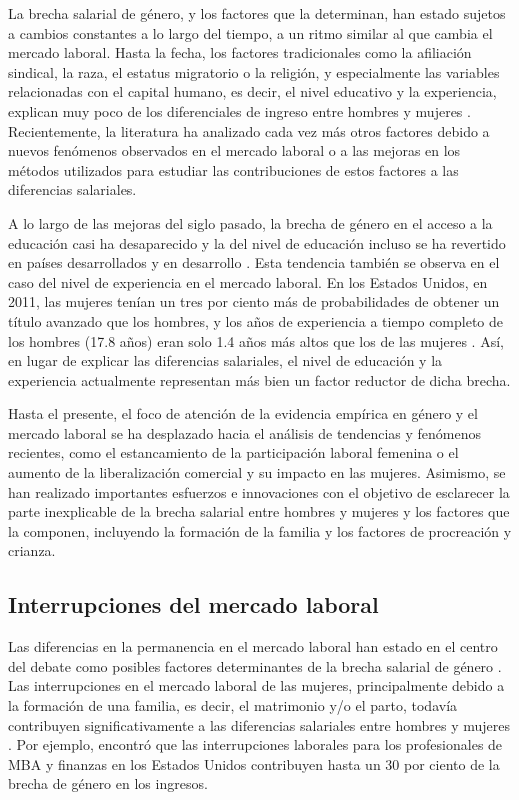 La brecha salarial de género, y los factores que la determinan, han estado sujetos a cambios constantes a lo largo del tiempo, a un ritmo similar al que cambia el mercado laboral. Hasta la fecha, los factores tradicionales como la afiliación sindical, la raza, el estatus migratorio o la religión, y especialmente las variables relacionadas con el capital humano, es decir, el nivel educativo y la experiencia, explican muy poco de los diferenciales de ingreso entre hombres y mujeres \citep{Blau2017,Weichselbaumer2005}. Recientemente, la literatura ha analizado cada vez más otros factores debido a nuevos fenómenos observados en el mercado laboral o a las mejoras en los métodos utilizados para estudiar las contribuciones de estos factores a las diferencias salariales.

A lo largo de las mejoras del siglo pasado, la brecha de género en el acceso a la educación casi ha desaparecido y la del nivel de educación incluso se ha revertido en países desarrollados y en desarrollo \citep{Becker2010,Gaddis2013,Goldin2006}.  Esta tendencia también se observa en el caso del nivel de experiencia en el mercado laboral. En los Estados Unidos, en 2011, las mujeres tenían un tres por ciento más de probabilidades de obtener un título avanzado que los hombres, y los años de experiencia a tiempo completo de los hombres (17.8 años) eran solo 1.4 años más altos que los de las mujeres \citep{Blau2017}. Así, en lugar de explicar las diferencias salariales, el nivel de educación y la experiencia actualmente representan más bien un factor reductor de dicha brecha.

Hasta el presente, el foco de atención de la evidencia empírica en género y el mercado laboral se ha desplazado hacia el análisis de tendencias y fenómenos recientes, como el estancamiento de la participación laboral femenina o el aumento de la liberalización comercial y su impacto en las mujeres. Asimismo, se han realizado importantes esfuerzos e innovaciones con el objetivo de esclarecer la parte inexplicable de la brecha salarial entre hombres y mujeres y los factores que la componen, incluyendo la formación de la familia y los factores de procreación y crianza.

\subsection{Interrupciones del mercado laboral}
Las diferencias en la permanencia en el mercado laboral han estado en el centro del debate como posibles factores determinantes de la brecha salarial de género \citep{Mincer1974}. Las interrupciones en el mercado laboral de las mujeres, principalmente debido a la formación de una familia, es decir, el matrimonio y/o el parto, todavía contribuyen significativamente a las diferencias salariales entre hombres y mujeres \citep{WorldBank2012}. Por ejemplo, \citet{Goldin2014} encontró que las interrupciones laborales para los profesionales de MBA y finanzas en los Estados Unidos contribuyen hasta un 30 por ciento de la brecha de género en los ingresos.


